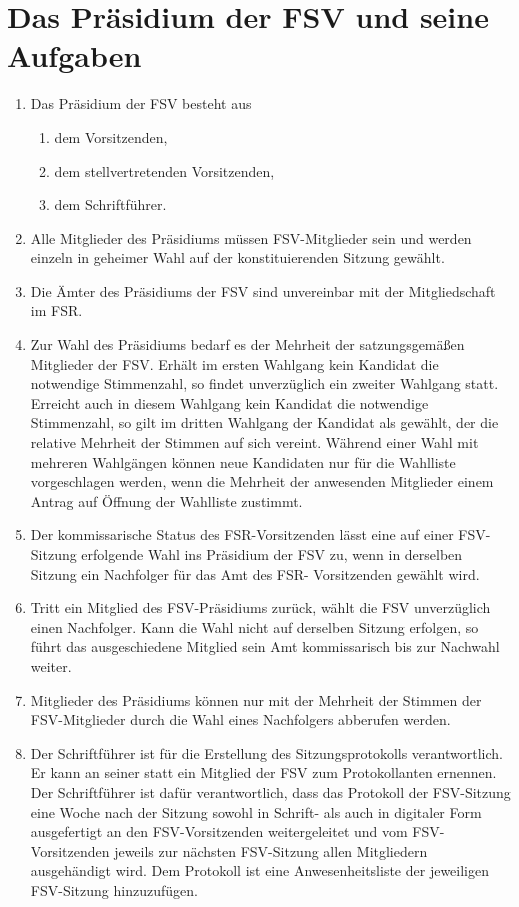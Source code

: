\documentclass{article}
\begin{document}
\section{Das Präsidium der FSV und seine Aufgaben}
\begin{enumerate}[(1)]
	\item Das Präsidium der FSV besteht aus
	\begin{enumerate}[1.]
		\item dem Vorsitzenden,
		\item dem stellvertretenden Vorsitzenden,
		\item dem Schriftführer.
	\end{enumerate}
    \item Alle Mitglieder des Präsidiums müssen FSV-Mitglieder sein und werden einzeln in geheimer Wahl auf der konstituierenden Sitzung gewählt.
    \item Die Ämter des Präsidiums der FSV sind unvereinbar mit der Mitgliedschaft im FSR.
	\item Zur Wahl des Präsidiums bedarf es der Mehrheit der satzungsgemäßen Mitglieder der FSV. Erhält im ersten Wahlgang kein Kandidat die notwendige Stimmenzahl, so findet unverzüglich ein zweiter Wahlgang statt. Erreicht auch in diesem Wahlgang kein Kandidat die notwendige Stimmenzahl, so gilt im dritten Wahlgang der Kandidat als gewählt, der die relative Mehrheit der Stimmen auf sich vereint. Während einer Wahl mit mehreren Wahlgängen können neue Kandidaten nur für die Wahlliste vorgeschlagen werden, wenn die Mehrheit der anwesenden Mitglieder einem Antrag auf Öffnung der Wahlliste zustimmt.
	\item Der kommissarische Status des FSR-Vorsitzenden lässt eine auf einer FSV-Sitzung erfolgende Wahl ins Präsidium der FSV zu, wenn in derselben Sitzung ein Nachfolger für das Amt des FSR- Vorsitzenden gewählt wird.
	\item Tritt ein Mitglied des FSV-Präsidiums zurück, wählt die FSV unverzüglich einen Nachfolger. Kann die Wahl nicht auf derselben Sitzung erfolgen, so führt das ausgeschiedene Mitglied sein Amt kommissarisch bis zur Nachwahl weiter.
	\item Mitglieder des Präsidiums können nur mit der Mehrheit der Stimmen der FSV-Mitglieder durch die Wahl eines Nachfolgers abberufen werden.
	\item Der Schriftführer ist für die Erstellung des Sitzungsprotokolls verantwortlich. Er kann an seiner statt ein Mitglied der FSV zum Protokollanten ernennen. Der Schriftführer ist dafür verantwortlich, dass das Protokoll der FSV-Sitzung eine Woche nach der Sitzung sowohl in Schrift- als auch in digitaler Form ausgefertigt an den FSV-Vorsitzenden weitergeleitet und vom FSV-Vorsitzenden jeweils zur nächsten FSV-Sitzung allen Mitgliedern ausgehändigt wird. Dem Protokoll ist eine Anwesenheitsliste der jeweiligen FSV-Sitzung hinzuzufügen.

\end{enumerate}
\end{document}
